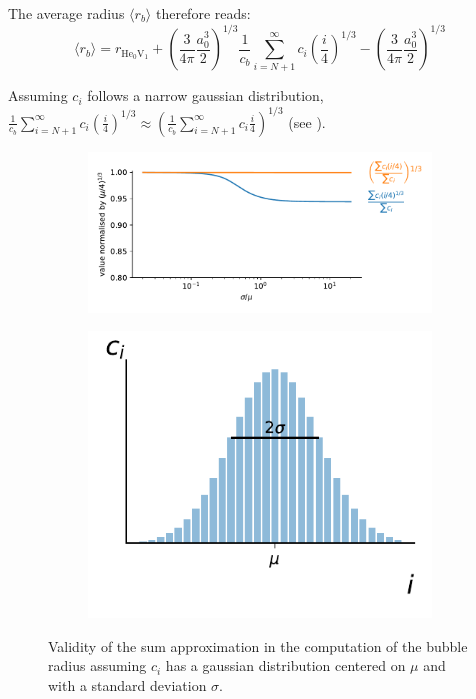 The average radius $\langle r_b \rangle$ therefore reads:
\begin{equation}
    \langle r_b \rangle = r_{\mathrm{He}_0 \mathrm{V}_1} + \left(\frac{3}{4 \pi} \frac{a_0^3}{2} \right)^{1/3} \frac{1}{c_b}\sum\limits_{i=N+1}^\infty c_i(\frac{i}{4})^{1/3} - \left(\frac{3}{4 \pi} \frac{a_0^3}{2} \right)^{1/3}
\end{equation}

Assuming $c_i$ follows a narrow gaussian distribution, $\frac{1}{c_b}\sum\limits_{i=N+1}^\infty c_i(\frac{i}{4})^{1/3} \approx \left( \frac{1}{c_b}\sum\limits_{i=N+1}^\infty c_i\frac{i}{4} \right)^{1/3} $ (see ).

\begin{figure}
    \begin{subfigure}{0.75\linewidth}
        \includegraphics[width=\linewidth]{Figures/Chapter5/comparison_sum_of_powers_power_of_sums.pdf}
    \end{subfigure}%
    \begin{subfigure}{0.25\linewidth}
        \includegraphics[width=\linewidth]{Figures/Chapter5/gaussian_representation.pdf}
    \end{subfigure}
    \caption{Validity of the sum approximation in the computation of the bubble radius assuming $c_i$ has a gaussian distribution centered on $\mu$ and with a standard deviation $\sigma$.}
\end{figure}


